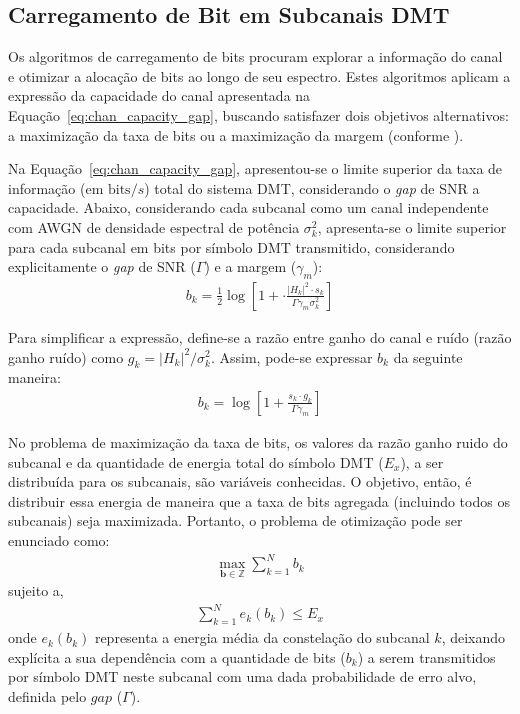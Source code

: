 \subsection{Carregamento de Bit em Subcanais DMT}
\label{subsec:bit_loading}

Os algoritmos de carregamento de bits procuram explorar a informação do canal e otimizar a alocação de bits ao longo de seu espectro. Estes algoritmos aplicam a expressão da capacidade do canal apresentada na Equação~\ref{eq:chan_capacity_gap},  buscando satisfazer
dois objetivos alternativos: a maximização da taxa de bits ou a maximização da margem (conforme \cite{campello1999}).

Na Equação~\ref{eq:chan_capacity_gap}, apresentou-se o limite superior da taxa de informação (em $\text{bits}/s$) total do sistema DMT, considerando o \textsl{gap} de SNR a capacidade. Abaixo, considerando cada subcanal como um canal independente com AWGN de densidade espectral de potência $\sigma_k^2$, apresenta-se o limite superior para cada subcanal em bits por símbolo DMT transmitido, considerando explicitamente o \textsl{gap} de SNR ($\Gamma$) e a margem ($\gamma_m$):
\begin{align}
b_k = \frac{1}{2} \log \left[1 + \cdot\frac{ \left|H_k\right|^2 \cdot s_k }{ \Gamma \gamma_m \sigma_k^2 } \right] 
\label{eq:b_k}
\end{align}

Para simplificar a expressão, define-se a razão entre ganho do canal e ruído (razão ganho ruído) como $g_k = \left|H_k \right|^2 / \sigma_k^2 $. Assim, pode-se expressar $b_k$ da seguinte maneira:
\begin{align}
b_k = \log \left[1 + \frac{s_k \cdot g_k}{\Gamma \gamma_m}   \right] 
\end{align}

No problema de maximização da taxa de bits, os valores da razão ganho ruido do subcanal e da quantidade de energia total do símbolo DMT ($E_x$), a ser distribuída para os subcanais, são variáveis conhecidas. O objetivo, então, é distribuir essa energia de maneira que a taxa de bits agregada (incluindo todos os subcanais) seja maximizada. Portanto, o problema de otimização pode ser enunciado como:
\begin{align}
\max_{\mathbf{b} \in \mathbb{Z}} \sum \limits_{k=1}^{N} b_k \nonumber
\end{align}
sujeito a, 
\begin{align}
\sum \limits_{k=1}^{N} e_k \left(b_k \right) \leq E_x
\end{align}
onde $e_k \left(b_k \right)$ representa a energia média da constelação do subcanal $k$, deixando explícita a sua dependência com a quantidade de bits ($b_k$) a serem transmitidos por símbolo DMT neste subcanal com uma dada probabilidade de erro alvo, definida pelo $gap$ ($\Gamma$).

